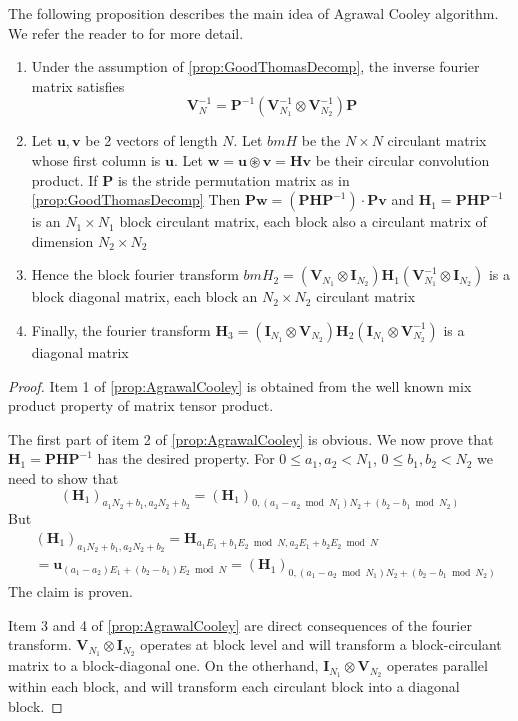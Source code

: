 The following proposition describes the main idea of Agrawal Cooley algorithm. We refer the reader to \cite[Sect~7.2]{BOOK:LRTMAC89} for more detail.
\begin{proposition}\label{prop:AgrawalCooley}
    \begin{enumerate}
        \item Under the assumption of \cref{prop:GoodThomasDecomp}, the inverse fourier matrix satisfies
        \[ \bm{V}_N^{-1} = \bm{P}^{-1} \left(\bm{V}_{N_1}^{-1} \otimes \bm{V}_{N_2}^{-1}\right) \bm{P} \]
        \item Let \(\bm{u}, \bm{v}\) be 2 vectors of length \(N\). Let \(bm{H}\) be the \(N \times N\) circulant matrix whose first column is \(\bm{u}\). Let \(\bm{w} = \bm{u} \circledast \bm{v} = \bm{H} \bm{v}\) be their circular convolution product. If \(\bm{P}\) is the stride permutation matrix as in \cref{prop:GoodThomasDecomp} Then \(\bm{P} \bm{w} = \left(\bm{P} \bm{H} \bm{P}^{-1}\right) \cdot \bm{P} \bm{v}\) and \(\bm{H}_1 = \bm{P} \bm{H} \bm{P}^{-1}\) is an \(N_1 \times N_1\) block circulant matrix, each block also a circulant matrix of dimension \(N_2 \times N_2\)
        \item Hence the block fourier transform \(bm{H}_2 = \left(\bm{V}_{N_1} \otimes \bm{I}_{N_2}\right) \bm{H}_1 \left(\bm{V}_{N_1}^{-1} \otimes \bm{I}_{N_2}\right)\) is a block diagonal matrix, each block an \(N_2 \times N_2\) circulant matrix
        \item Finally, the fourier transform \(\bm{H}_3 = \left(\bm{I}_{N_1} \otimes \bm{V}_{N_2}\right) \bm{H}_2 \left(\bm{I}_{N_1} \otimes \bm{V}_{N_2}^{-1}\right)\) is a diagonal matrix
    \end{enumerate}
\end{proposition}
\begin{proof}
    Item 1 of \cref{prop:AgrawalCooley} is obtained from the well known mix product property of matrix tensor product.

    The first part of item 2 of \cref{prop:AgrawalCooley} is obvious. We now prove that \(\bm{H}_1 = \bm{P} \bm{H} \bm{P}^{-1}\) has the desired property. For \(0 \le a_1, a_2 < N_1\), \(0 \le b_1, b_2 < N_2\) we need to show that
    \[(\bm{H}_1)_{a_1 N_2 + b_1, a_2 N_2 + b_2} = (\bm{H}_1)_{0, (a_1 - a_2 \bmod N_1)N_2 + (b_2 - b_1 \bmod N_2)}\]
    But
    \begin{align*}
        &(\bm{H}_1)_{a_1 N_2 + b_1, a_2 N_2 + b_2} = \bm{H}_{a_1 E_1 + b_1 E_2 \bmod N, a_2 E_1 + b_2 E_2 \bmod N} \\
        &= \bm{u}_{(a_1 - a_2)E_1 + (b_2 - b_1)E_2 \bmod N} = (\bm{H}_1)_{0, (a_1 - a_2 \bmod N_1)N_2 + (b_2 - b_1 \bmod N_2)}
    \end{align*}
    The claim is proven.

    Item 3 and 4 of \cref{prop:AgrawalCooley} are direct consequences of the fourier transform. \(\bm{V}_{N_1} \otimes \bm{I}_{N_2}\) operates at block level and will transform a block-circulant matrix to a block-diagonal one. On the otherhand, \(\bm{I}_{N_1} \otimes \bm{V}_{N_2}\) operates parallel within each block, and will transform each circulant block into a diagonal block. 
\end{proof}


